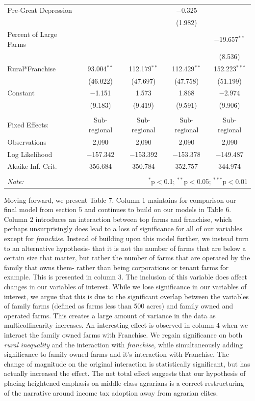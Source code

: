 \documentclass[letter, 12pt]{article}
\begin{document}
\begin{table}[!htbp]
\begin{tabular}{@{\extracolsep{5pt}}lcccc}
 		Pre-Great Depression &  &  & $-$0.325 &  \\ 
 		&  &  & (1.982) &  \\ 
 		Percent of Large Farms &  &  &  & $-$19.657$^{**}$ \\ 
 		&  &  &  & (8.536) \\ 
 		Rural*Franchise & 93.004$^{**}$ & 112.179$^{**}$ & 112.429$^{**}$ & 152.223$^{***}$ \\ 
 		& (46.022) & (47.697) & (47.758) & (51.199) \\ 
 		Constant & $-$1.151 & 1.573 & 1.868 & $-$2.974 \\ 
 		& (9.183) & (9.419) & (9.591) & (9.906) \\ 
 		\hline \\[-1.8ex] 
 		Fixed Effects: & Sub-regional & Sub-regional & Sub-regional & Sub-regional \\ 
 		Observations & 2,090 & 2,090 & 2,090 & 2,090 \\ 
 		Log Likelihood & $-$157.342 & $-$153.392 & $-$153.378 & $-$149.487 \\ 
 		Akaike Inf. Crit. & 356.684 & 350.784 & 352.757 & 344.974 \\ 
 		\hline 
 		\hline \\[-1.8ex] 
 		\textit{Note:}  & \multicolumn{4}{r}{$^{*}$p$<$0.1; $^{**}$p$<$0.05; $^{***}$p$<$0.01} \\ 
 	\end{tabular} 
 \end{table}
 
 Moving forward, we present Table 7. Column 1 maintains for comparison our final model from section 5 and continues to build on our models in Table 6. Column 2 introduces an interaction between top farms and franchise, which perhaps unsurprisingly does lead to a loss of significance for all of our variables except for 
\emph{franchise}. Instead of building upon this model further, we instead turn to an alternative hypothesis- that it is not the number of farms that are below a certain size that matter, but rather the number of farms that are operated by the family that owns them- rather than being corporations or tenant farms for example. This is presented in column 3. The inclusion of this variable does affect changes in our variables of interest. While we lose significance in our variables of interest, we argue that this is due to the significant overlap between the variables of family farms (defined as farms less than 500 acres) and family owned and operated farms. This creates a large amount of variance in the data as multicollinearity increases. An interesting effect is observed in column 4 when we interact the family owned farms with Franchise. We regain significance on both \emph{rural inequality} and the interaction with \emph{franchise}, while simultaneously adding significance to family owned farms and it's interaction with Franchise. The change of magnitude on the original interaction is statistically significant, but has actually increased the effect. The net total effect suggests that our hypothesis of placing heightened emphasis on middle class agrarians is a correct restructuring of the narrative around income tax adoption away from agrarian elites.
\end{document}
